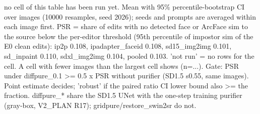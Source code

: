 \begin{table}[t]
\centering
\small
{}
\caption{E5: v2\_main (+ v2\_final) under held-out purifiers (SD1.5 s0.55). Gate: NOT RUN}
\label{tab:e5}
\par\footnotesize no cell of this table has been run yet. Mean with 95\% percentile-bootstrap CI over images (10000 resamples, seed 2026); seeds and prompts are averaged within each image first. PSR = share of edits with no detected face or ArcFace sim to the source below the per-editor threshold (95th percentile of impostor sim of the E0 clean edits): ip2p 0.108, ipadapter\_faceid 0.108, sd15\_img2img 0.101, sd\_inpaint 0.110, sdxl\_img2img 0.104, pooled 0.103. 'not run' = no rows for the cell. A cell with fewer images than the largest cell shows (n=...). Gate: PSR under diffpure\_0.1 >= 0.5 x PSR without purifier (SD1.5 s0.55, same images). Point estimate decides; 'robust' if the paired ratio CI lower bound also >= the fraction.  diffpure\_* share the SD1.5 UNet with the one-step training purifier (gray-box, V2\_PLAN R17); gridpure/restore\_swin2sr do not.
\end{table}
